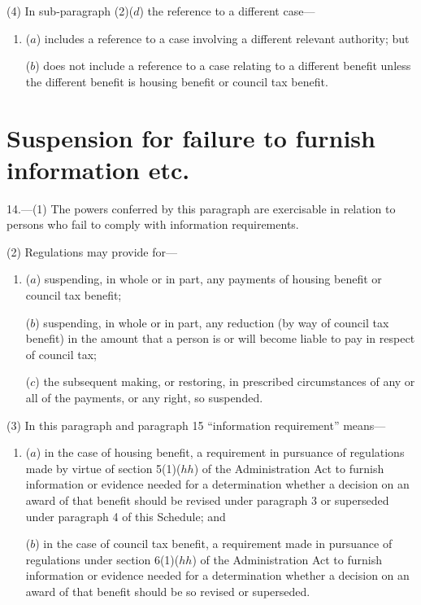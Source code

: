 \documentclass[12pt,a4paper]{article}
\begin{document}
(4) In sub-paragraph (2)($d$)  the reference to a different case—
\begin{enumerate}\item[]
($a$) includes a reference to a case involving a different relevant authority; but

($b$) does not include a reference to a case relating to a different benefit unless the different benefit is housing benefit or council tax benefit.
\end{enumerate}

\section*{Suspension for failure to furnish information etc.}

14.---(1) The powers conferred by this paragraph are exercisable in relation to persons who fail to comply with information requirements.

(2) Regulations may provide for—
\begin{enumerate}\item[]
($a$) suspending, in whole or in part, any payments of housing benefit or council tax benefit;

($b$) suspending, in whole or in part, any reduction (by way of council tax benefit) in the amount that a person is or will become liable to pay in respect of council tax;

($c$) the subsequent making, or restoring, in prescribed circumstances of any or all of the payments, or any right, so suspended.
\end{enumerate}

(3) In this paragraph and paragraph 15 “information requirement” means—
\begin{enumerate}\item[]
($a$) in the case of housing benefit, a requirement in pursuance of regulations made by virtue of section 5(1)($hh$)  of the Administration Act to furnish information or evidence needed for a determination whether a decision on an award of that benefit should be revised under paragraph 3 or superseded under paragraph 4 of this Schedule; and

($b$) in the case of council tax benefit, a requirement made in pursuance of regulations under section 6(1)($hh$)  of the Administration Act to furnish information or evidence needed for a determination whether a decision on an award of that benefit should be so revised or superseded.
\end{enumerate}
\end{document}

